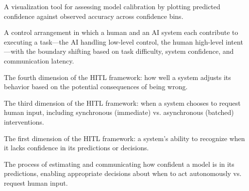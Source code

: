 \begin{description}[style=nextline, leftmargin=2em]
\item[Reliability Diagram]
A visualization tool for assessing model calibration by plotting predicted confidence against observed accuracy across confidence bins.

\item[Shared Autonomy]
A control arrangement in which a human and an AI system each contribute to executing a task---the AI handling low-level control, the human high-level intent---with the boundary shifting based on task difficulty, system confidence, and communication latency.

\item[Stakes Calibration]
The fourth dimension of the HITL framework: how well a system adjusts its behavior based on the potential consequences of being wrong.

\item[Timing]
The third dimension of the HITL framework: when a system chooses to request human input, including synchronous (immediate) vs. asynchronous (batched) interventions.

\item[Uncertainty Detection]
The first dimension of the HITL framework: a system's ability to recognize when it lacks confidence in its predictions or decisions.

\item[Uncertainty Quantification]
The process of estimating and communicating how confident a model is in its predictions, enabling appropriate decisions about when to act autonomously vs. request human input.

\end{description}
